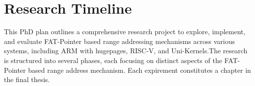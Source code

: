 


\chapter{Research Timeline}  %

\ifpdf
    \graphicspath{{ResearchTimeline/Figs/Raster/}{ResearchTimeline/Figs/PDF/}{ResearchTimeline/Figs/}}
\else
    \graphicspath{{ResearchTimeline/Figs/}{ResearchTimeline/Figs/}}
\fi

\begin{table}[]
    \caption{List of relavent conferences to submit for the following PhD expirements.}
    \end{table}

This PhD plan outlines a comprehensive research project to explore, implement, and evaluate FAT-Pointer based range addressing mechanisms across various systems, 
including ARM with hugepages, RISC-V, and Uni-Kernels.The research is structured into several phases, each focusing on distinct aspects of the FAT-Pointer based range address
mechanism. Each expirement constitutes a chapter in the final thesis.

